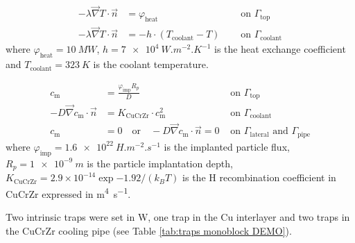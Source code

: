 \begin{subequations}
    \begin{align}
    -\lambda \vec{\nabla} T \cdot \vec{n} &=\varphi_\mathrm{heat} \quad  &\text { on } \Gamma_\mathrm{top}\\
    -\lambda \vec{\nabla} T\cdot \vec{n} &= -h \cdot \left(T_\mathrm{coolant} - T\right)\quad &\text { on } \Gamma_\mathrm{coolant}
    \end{align}
    \label{eq: bc thermal DEMO monoblock}
\end{subequations}
where $\varphi_\mathrm{heat}=\SI{10}{MW}$, $h=\SI{7e4}{W.m^{-2}.K^{-1}}$ is the heat exchange coefficient and $T_\mathrm{coolant} = \SI{323}{K}$ is the coolant temperature.

\begin{subequations}
    \begin{align}
    c_\mathrm{m} &=  \frac{\varphi_\mathrm{imp} R_p}{D} \quad &\text { on } \Gamma_\mathrm{top}\\
    -D \vec{\nabla} c_\mathrm{m} \cdot \vec{n} &= K_\mathrm{CuCrZr} \cdot c_\mathrm{m}^{2} \quad &\text { on } \Gamma_\mathrm{coolant} \\
    c_\mathrm{m} &=  0 \quad \text{or} \quad -D \vec{\nabla} c_\mathrm{m} \cdot \vec{n} = 0 &\text { on } \Gamma_\mathrm{lateral} \text{  and  } \Gamma_\mathrm{pipe}
    \end{align}
    \label{eq: bc H transport DEMO monoblock}
\end{subequations}
where $\varphi_\mathrm{imp} = \SI{1.6e22}{H.m^{-2}.s^{-1}}$ is the implanted particle flux, $R_p = \SI{1e-9}{m}$ is the particle implantation depth, $K_\mathrm{CuCrZr}=2.9\times 10^{-14}\exp{-1.92/(k_B T)}$ is the H recombination coefficient in CuCrZr expressed in \si{m^4.s^{-1}}.

Two intrinsic traps were set in W, one trap in the Cu interlayer and two traps in the CuCrZr cooling pipe (see Table \ref{tab:traps monoblock DEMO}).


